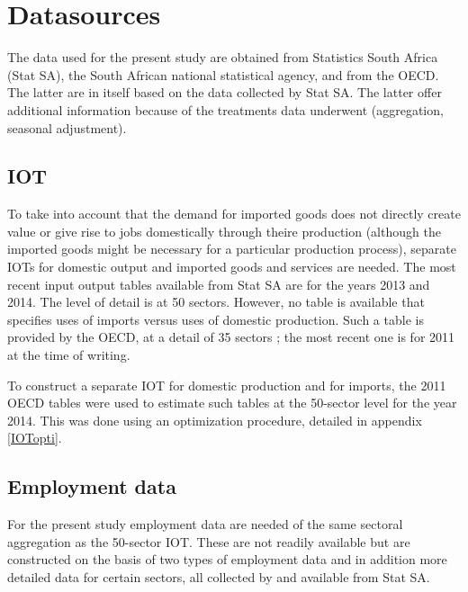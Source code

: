 \documentclass[12pt,english]{article}
\begin{document}
\section{Datasources}

The data used for the present study are obtained from Statistics South Africa (Stat SA), the South African national statistical agency, and from the OECD. The latter are in itself based on the data collected by Stat SA. The latter offer additional information because of the treatments data underwent (aggregation, seasonal adjustment). %

\subsection{IOT}	

To take into account that the demand for imported goods does not directly create value or give rise to jobs domestically through theire production (although the imported goods might be necessary for a particular production process), separate IOTs for domestic output and imported goods and services are needed. The most recent input output tables available from Stat SA are for the years 2013 and 2014. The level of detail is at 50 sectors. However, no table is available that specifies uses of imports versus uses of domestic production. Such a table is provided by the OECD, at a detail of 35 sectors ; the most recent one is for 2011 at the time of writing.

To construct a separate IOT for domestic production and for imports, the 2011 OECD tables were used to estimate such tables at the 50-sector level for the year 2014. This was done using an optimization procedure, detailed in appendix \ref{IOTopti}.


\subsection{Employment data}
For the present study employment data are needed of the same sectoral aggregation as the 50-sector IOT. These are not readily available but are constructed on the basis of two types of employment data and in addition more detailed data for certain sectors, all collected by and available from Stat SA.
 
\end{document}
